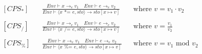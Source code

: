 \begin{align*}
%
&[CPS_*] & &\frac{Env \vdash x \rightarrow_e v_1 \quad Env \vdash e \rightarrow_e v_2}{Env \vdash \langle x \text{ *= } e, sto \rangle \rightarrow sto[x \mapsto v]} & &\text{where } v = v_1 \cdot v_2\\\\
%
&[CPS_/] & &\frac{Env \vdash x \rightarrow_e v_1 \quad Env \vdash e \rightarrow_e v_2}{Env \vdash \langle x \text{ /= } e, sto \rangle \rightarrow sto[x \mapsto v]} & &\text{where } v = \frac{v_1}{v_2}\\\\
%
&[CPS_\%] & &\frac{Env \vdash x \rightarrow_e v_1 \quad Env \vdash e \rightarrow_e v_2}{Env \vdash \langle x \text{ \%= } e, sto \rangle \rightarrow sto[x \mapsto v]} & &\text{where } v = v_1 \text{ mod } v_2
\end{align*}